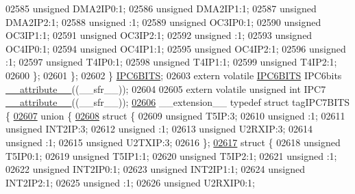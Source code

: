 \begin{DoxyCode}
02585       \textcolor{keywordtype}{unsigned} DMA2IP0:1;
02586       \textcolor{keywordtype}{unsigned} DMA2IP1:1;
02587       \textcolor{keywordtype}{unsigned} DMA2IP2:1;
02588       \textcolor{keywordtype}{unsigned} :1;
02589       \textcolor{keywordtype}{unsigned} OC3IP0:1;
02590       \textcolor{keywordtype}{unsigned} OC3IP1:1;
02591       \textcolor{keywordtype}{unsigned} OC3IP2:1;
02592       \textcolor{keywordtype}{unsigned} :1;
02593       \textcolor{keywordtype}{unsigned} OC4IP0:1;
02594       \textcolor{keywordtype}{unsigned} OC4IP1:1;
02595       \textcolor{keywordtype}{unsigned} OC4IP2:1;
02596       \textcolor{keywordtype}{unsigned} :1;
02597       \textcolor{keywordtype}{unsigned} T4IP0:1;
02598       \textcolor{keywordtype}{unsigned} T4IP1:1;
02599       \textcolor{keywordtype}{unsigned} T4IP2:1;
02600     \};
02601   \};
02602 \} \hyperlink{a00014_d2/d50/a00561}{IPC6BITS};
02603 \textcolor{keyword}{extern} \textcolor{keyword}{volatile} \hyperlink{a00014_d2/d50/a00561}{IPC6BITS} IPC6bits \hyperlink{a00015_a493c46f03454991ccc5aa7a6e1dfb2a7}{\_\_attribute\_\_}((\_\_sfr\_\_));
02604 
02605 \textcolor{keyword}{extern} \textcolor{keyword}{volatile} \textcolor{keywordtype}{unsigned} \textcolor{keywordtype}{int}  IPC7 \hyperlink{a00015_a493c46f03454991ccc5aa7a6e1dfb2a7}{\_\_attribute\_\_}((\_\_sfr\_\_));
\hypertarget{a00015_source_l02606}{}\hyperlink{a00014}{02606} \_\_extension\_\_ \textcolor{keyword}{typedef} \textcolor{keyword}{struct }tagIPC7BITS \{
\hypertarget{a00015_source_l02607}{}\hyperlink{a00015}{02607}   \textcolor{keyword}{union }\{
\hypertarget{a00015_source_l02608}{}\hyperlink{a00015}{02608}     \textcolor{keyword}{struct }\{
02609       \textcolor{keywordtype}{unsigned} T5IP:3;
02610       \textcolor{keywordtype}{unsigned} :1;
02611       \textcolor{keywordtype}{unsigned} INT2IP:3;
02612       \textcolor{keywordtype}{unsigned} :1;
02613       \textcolor{keywordtype}{unsigned} U2RXIP:3;
02614       \textcolor{keywordtype}{unsigned} :1;
02615       \textcolor{keywordtype}{unsigned} U2TXIP:3;
02616     \};
\hypertarget{a00015_source_l02617}{}\hyperlink{a00015}{02617}     \textcolor{keyword}{struct }\{
02618       \textcolor{keywordtype}{unsigned} T5IP0:1;
02619       \textcolor{keywordtype}{unsigned} T5IP1:1;
02620       \textcolor{keywordtype}{unsigned} T5IP2:1;
02621       \textcolor{keywordtype}{unsigned} :1;
02622       \textcolor{keywordtype}{unsigned} INT2IP0:1;
02623       \textcolor{keywordtype}{unsigned} INT2IP1:1;
02624       \textcolor{keywordtype}{unsigned} INT2IP2:1;
02625       \textcolor{keywordtype}{unsigned} :1;
02626       \textcolor{keywordtype}{unsigned} U2RXIP0:1;

\end{DoxyCode}
